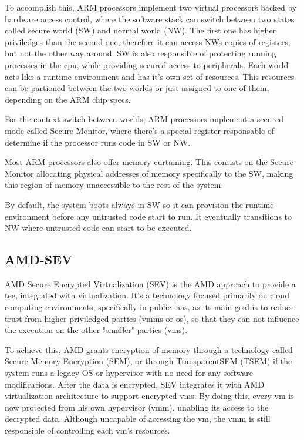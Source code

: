 To accomplish this, ARM processors implement two virtual processors backed by hardware access control, where the software stack can switch between two states called secure world (SW) and normal world (NW). 
The first one has higher priviledges than the second one, therefore it can access NWs copies of registers, but not the other way around. SW is also responsible of protecting running processes in the \gls{cpu}, while providing secured access to peripherals. 
Each world acts like a runtime environment and has it's own set of resources. This resources can be partioned between the two worlds or just assigned to one of them, depending on the ARM chip specs.

For the context switch between worlds, ARM processors implement a secured mode called Secure Monitor, where there's a special register responsable of determine if the processor runs code in SW or NW. 

Most ARM processors also offer memory curtaining. This consists on the Secure Monitor allocating physical addresses of memory specifically to the SW, making this region of memory unaccessible to the rest of the system.

By default, the system boots always in SW so it can provision the runtime environment before any untrusted code start to run. It eventually transitions to NW where untrusted code can start to be executed. 

\subsection{AMD-SEV}
\label{ssec:amdsev}
AMD Secure Encrypted Virtualization (SEV) is the AMD approach to provide a \gls{tee}, integrated with virtualization. It's a technology focused primarily on cloud computing environments, specifically in public \gls{iaas}, as its main goal is to reduce trust from higher priviledged parties (\gls{vmm}s or \gls{os}), so that they can not influence the execution on the other "smaller" parties (\gls{vm}s). 

To achieve this, AMD grants encryption of memory through a technology called Secure Memory Encryption (SEM), or through TransparentSEM (TSEM) if the system runs a legacy OS or hypervisor with no need for any software modifications.
After the data is encrypted, SEV integrates it with AMD virtualization architecture to support encrypted \gls{vm}s. By doing this, every \gls{vm} is now protected from his own hypervisor (\gls{vmm}), unabling its access to the decrypted data. Although uncapable of accessing the \gls{vm}, the \gls{vmm} is still responsible of controlling each \gls{vm}'s resources. \cite{amdPaper}

